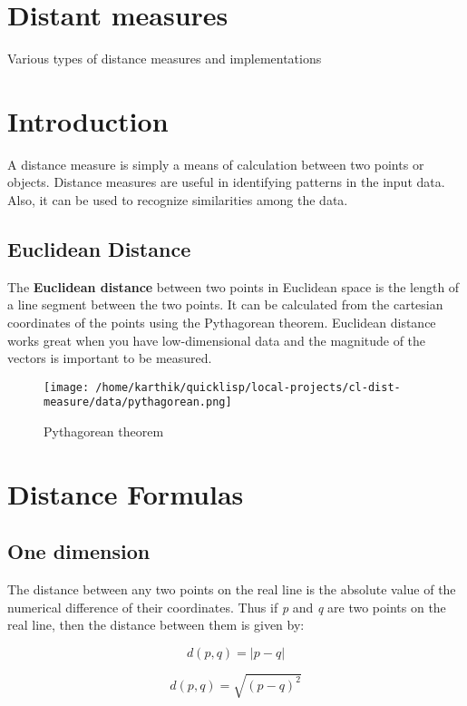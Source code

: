 \documentclass[11pt]{article}
\author{Karthik Kumar}
\date{\today}
\title{}
\begin{document}
\tableofcontents

\section{Distant measures}
\label{sec:org29f65a4}
Various types of distance measures and implementations

\section{Introduction}
\label{sec:orgceba741}
A distance measure is simply a means of calculation between two points
or objects. Distance measures are useful in identifying patterns in the
input data. Also, it can be used to recognize similarities among the
data.

\subsection{Euclidean Distance}
\label{sec:orgeb3936b}
The \textbf{Euclidean distance} between two points in Euclidean space is the
length of a line segment between the two points. It can be calculated
from the cartesian coordinates of the points using the Pythagorean
theorem. Euclidean distance works great when you have low-dimensional
data and the magnitude of the vectors is important to be measured.\\

\begin{figure}[htbp]
\centering
\texttt{[image: /home/karthik/quicklisp/local-projects/cl-dist-measure/data/pythagorean.png]}
\caption{\label{fig:org36c3078}Pythagorean theorem}
\end{figure}

\section{Distance Formulas}
\label{sec:org004994f}
\subsection{One dimension}
\label{sec:org9c9bbca}
The distance between any two points on the real line is the absolute
value of the numerical difference of their coordinates. Thus if \emph{p} and
\emph{q} are two points on the real line, then the distance between them is
given by:

$$
d(p, q) = |p -q|
$$

$$
d(p, q) = \sqrt{(p-q)^2}
$$
\end{document}
